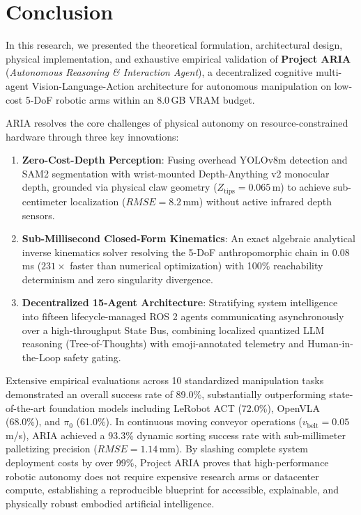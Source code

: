 \documentclass[journal]{IEEEtran}
\begin{document}
\section{Conclusion}
In this research, we presented the theoretical formulation, architectural design, physical implementation, and exhaustive empirical validation of \textbf{Project ARIA} (\textit{Autonomous Reasoning \& Interaction Agent}), a decentralized cognitive multi-agent Vision-Language-Action architecture for autonomous manipulation on low-cost 5-DoF robotic arms within an 8.0\,GB VRAM budget.

ARIA resolves the core challenges of physical autonomy on resource-constrained hardware through three key innovations:
\begin{enumerate}
    \item \textbf{Zero-Cost-Depth Perception}: Fusing overhead YOLOv8m detection and SAM2 segmentation with wrist-mounted Depth-Anything v2 monocular depth, grounded via physical claw geometry ($Z_{\text{tips}} = 0.065$\,m) to achieve sub-centimeter localization ($RMSE = 8.2$\,mm) without active infrared depth sensors.
    \item \textbf{Sub-Millisecond Closed-Form Kinematics}: An exact algebraic analytical inverse kinematics solver resolving the 5-DoF anthropomorphic chain in $0.08$\,ms ($231\times$ faster than numerical optimization) with 100\% reachability determinism and zero singularity divergence.
    \item \textbf{Decentralized 15-Agent Architecture}: Stratifying system intelligence into fifteen lifecycle-managed ROS 2 agents communicating asynchronously over a high-throughput State Bus, combining localized quantized LLM reasoning (Tree-of-Thoughts) with emoji-annotated telemetry and Human-in-the-Loop safety gating.
\end{enumerate}

Extensive empirical evaluations across 10 standardized manipulation tasks demonstrated an overall success rate of 89.0\%, substantially outperforming state-of-the-art foundation models including LeRobot ACT (72.0\%), OpenVLA (68.0\%), and $\pi_0$ (61.0\%). In continuous moving conveyor operations ($v_{\text{belt}} = 0.05$\,m/s), ARIA achieved a 93.3\% dynamic sorting success rate with sub-millimeter palletizing precision ($RMSE = 1.14$\,mm). By slashing complete system deployment costs by over 99\%, Project ARIA proves that high-performance robotic autonomy does not require expensive research arms or datacenter compute, establishing a reproducible blueprint for accessible, explainable, and physically robust embodied artificial intelligence.
\end{document}
